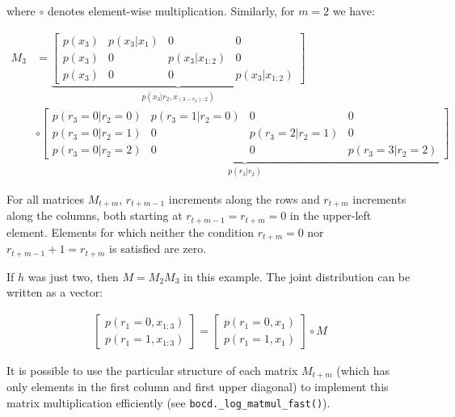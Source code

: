 \documentclass{article}
\begin{document}
where $\circ$ denotes element-wise multiplication. Similarly, for $m=2$ we have:

\begin{align}M_{3} & =\underbrace{\left[\begin{array}{cccc}
p(x_{3}) & p(x_{3}\vert x_{1}) & 0 & 0\\
p(x_{3}) & 0 & p(x_{3}\vert x_{1:2}) & 0\\
p(x_{3}) & 0 & 0 & p(x_{3}\vert x_{1:2})
\end{array}\right]}_{p(x_{3}\vert r_{2},x_{(3-r_{3}):2})}\\
 & \circ\underbrace{\left[\begin{array}{cccc}
p(r_{3}=0\vert r_{2}=0) & p(r_{3}=1\vert r_{2}=0) & 0 & 0\\
p(r_{3}=0\vert r_{2}=1) & 0 & p(r_{3}=2\vert r_{2}=1) & 0\\
p(r_{3}=0\vert r_{2}=2) & 0 & 0 & p(r_{3}=3\vert r_{2}=2)
\end{array}\right]}_{p(r_{3}\vert r_{2})}
\end{align}

For all matrices $M_{t+m}$, $r_{t+m-1}$ increments along the rows and $r_{t+m}$ increments along the columns, both starting at $r_{t+m-1}=r_{t+m}=0$ in the upper-left element. Elements for which neither the condition $r_{t+m}=0$ nor $r_{t+m-1}+1=r_{t+m}$ is satisfied are zero.

If $h$ was just two, then $M=M_{2}M_{3}$ in this example. The joint distribution can be written as a vector:

\begin{align}
\left[\begin{array}{c}
p(r_{1}=0,x_{1:3})\\
p(r_{1}=1,x_{1:3})
\end{array}\right]=\left[\begin{array}{c}
p(r_{1}=0,x_{1})\\
p(r_{1}=1,x_{1})
\end{array}\right]\circ M
\end{align}

It is possible to use the particular structure of each matrix $M_{t+m}$ (which has only elements in the first column and first upper diagonal) to implement this matrix multiplication efficiently (see \texttt{bocd.\_log\_matmul\_fast()}).
\end{document}
